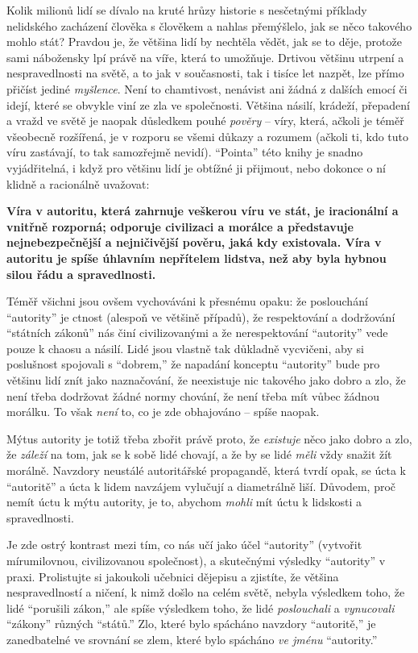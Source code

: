 \documentclass{book}
\begin{document}
Kolik milionů lidí se dívalo na kruté hrůzy historie s nesčetnými příklady nelidského zacházení člověka s člověkem a nahlas přemýšlelo, jak se něco takového mohlo stát? Pravdou je, že většina lidí by nechtěla vědět, jak se to děje, protože sami nábožensky lpí právě na víře, která to umožňuje. Drtivou většinu utrpení a nespravedlnosti na světě, a to jak v současnosti, tak i tisíce let nazpět, lze přímo přičíst jediné \emph{myšlence}. Není to chamtivost, nenávist ani žádná z dalších emocí či idejí, které se obvykle viní ze zla ve společnosti. Většina násilí, krádeží, přepadení a vražd ve světě je naopak důsledkem pouhé \emph{pověry} -- víry, která, ačkoli je téměř všeobecně rozšířená, je v rozporu se všemi důkazy a rozumem (ačkoli ti, kdo tuto víru zastávají, to tak samozřejmě nevidí). \enquote{Pointa} této knihy je snadno vyjádřitelná, i když pro většinu lidí je obtížné ji přijmout, nebo dokonce o ní klidně a racionálně uvažovat:

\textbf{Víra v autoritu, která zahrnuje veškerou víru ve stát, je iracionální a vnitřně rozporná; odporuje civilizaci a morálce a představuje nejnebezpečnější a nejničivější pověru, jaká kdy existovala. Víra v autoritu je spíše úhlavním nepřítelem lidstva, než aby byla hybnou silou řádu a spravedlnosti.}

Téměř všichni jsou ovšem vychováváni k přesnému opaku: že poslouchání \enquote{autority} je ctnost (alespoň ve většině případů), že respektování a dodržování \enquote{státních zákonů} nás činí civilizovanými a že nerespektování \enquote{autority} vede pouze k chaosu a násilí. Lidé jsou vlastně tak důkladně vycvičeni, aby si poslušnost spojovali s \enquote{dobrem,} že napadání konceptu \enquote{autority} bude pro většinu lidí znít jako naznačování, že neexistuje nic takového jako dobro a zlo, že není třeba dodržovat žádné normy chování, že není třeba mít vůbec žádnou morálku. To však \emph{není} to, co je zde obhajováno -- spíše naopak.

Mýtus autority je totiž třeba zbořit právě proto, že \emph{existuje} něco jako dobro a zlo, že \emph{záleží} na tom, jak se k sobě lidé chovají, a že by se lidé \emph{měli} vždy snažit žít morálně. Navzdory neustálé autoritářské propagandě, která tvrdí opak, se úcta k \enquote{autoritě} a úcta k lidem navzájem vylučují a diametrálně liší. Důvodem, proč nemít úctu k mýtu autority, je to, abychom \emph{mohli} mít úctu k lidskosti a spravedlnosti.

Je zde ostrý kontrast mezi tím, co nás učí jako účel \enquote{autority} (vytvořit mírumilovnou, civilizovanou společnost), a skutečnými výsledky \enquote{autority} v praxi. Prolistujte si jakoukoli učebnici dějepisu a zjistíte, že většina nespravedlností a ničení, k nimž došlo na celém světě, nebyla výsledkem toho, že lidé \enquote{porušili zákon,} ale spíše výsledkem toho, že lidé \emph{poslouchali} a \emph{vynucovali} \enquote{zákony} různých \enquote{států.} Zlo, které bylo spácháno navzdory \enquote{autoritě,} je zanedbatelné ve srovnání se zlem, které bylo spácháno \emph{ve jménu} \enquote{autority.}
\end{document}
